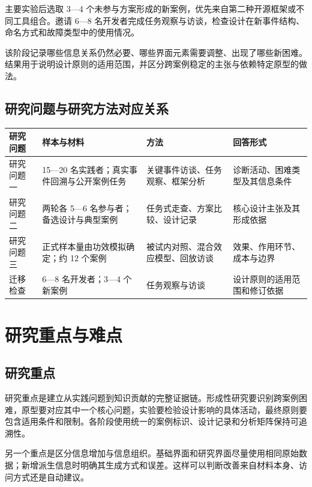 主要实验后选取 3—4 个未参与方案形成的新案例，优先来自第二种开源框架或不同工具组合。邀请 6—8 名开发者完成任务观察与访谈，检查设计在新事件结构、命名方式和故障类型中的使用情况。

该阶段记录哪些信息关系仍然必要、哪些界面元素需要调整、出现了哪些新困难。结果用于说明设计原则的适用范围，并区分跨案例稳定的主张与依赖特定原型的做法。

\subsection{研究问题与研究方法对应关系}

\begin{table}[H]
  \centering
  \small
  \begin{tabularx}{\textwidth}{p{} p{} p{} Y}
    \toprule
    研究问题 & 样本与材料 & 方法 & 回答形式 \\
    \midrule
    研究问题一 & 15—20 名实践者；真实事件回溯与公开案例任务 & 关键事件访谈、任务观察、框架分析 & 诊断活动、困难类型及其信息条件 \\
    研究问题二 & 两轮各 5—6 名参与者；备选设计与典型案例 & 任务式走查、方案比较、设计记录 & 核心设计主张及其形成依据 \\
    研究问题三 & 正式样本量由功效模拟确定；约 12 个案例 & 被试内对照、混合效应模型、回放访谈 & 效果、作用环节、成本与边界 \\
    迁移检查 & 6—8 名开发者；3—4 个新案例 & 任务观察与访谈 & 设计原则的适用范围和修订依据 \\
    \bottomrule
  \end{tabularx}
\end{table}

\section{研究重点与难点}

\subsection{研究重点}

研究重点是建立从实践问题到知识贡献的完整证据链。形成性研究要识别跨案例困难，原型要对应其中一个核心问题，实验要检验设计影响的具体活动，最终原则要包含适用条件和限制。各阶段使用统一的案例标识、设计记录和分析矩阵保持可追溯性。

另一个重点是区分信息增加与信息组织。基础界面和研究界面尽量使用相同原始数据；新增派生信息时明确其生成方式和误差。这样可以判断改善来自材料本身、访问方式还是自动建议。

